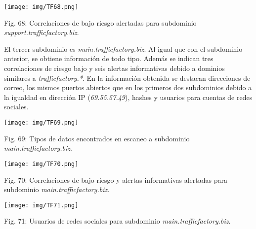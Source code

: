 \documentclass[12pt,oneside,a4paper]{book}
\begin{document}
\vspace{2em}

\begin{center}
	\texttt{[image: img/TF68.png]}
    
\vspace{0.1em}
    
    Fig. 68: Correlaciones de bajo riesgo alertadas para subdominio \textit{support.trafficfactory.biz}.
\end{center}

\vspace{2em}

\hspace{20pt}
El tercer subdominio es \textit{main.trafficfactory.biz}. Al igual que con el subdominio anterior, se obtiene información de todo tipo. Además se indican tres correlaciones de riesgo bajo y seis alertas informativas debido a dominios similares a \textit{trafficfactory.*}. En la información obtenida se destacan direcciones de correo, los mismos puertos abiertos que en los primeros dos subdominios debido a la igualdad en dirección IP (\textit{69.55.57.49}), hashes y usuarios para cuentas de redes sociales.

\vspace{2em}

\begin{center}
	\texttt{[image: img/TF69.png]}
    
\vspace{0.1em}
    
    Fig. 69: Tipos de datos encontrados en escaneo a subdominio \textit{main.trafficfactory.biz}.
\end{center}

\vspace{2em}

\begin{center}
	\texttt{[image: img/TF70.png]}
    
\vspace{0.1em}
    
    Fig. 70: Correlaciones de  bajo riesgo y alertas informativas alertadas para subdominio \textit{main.trafficfactory.biz}.
\end{center}

\newpage

\begin{center}
	\texttt{[image: img/TF71.png]}
    
\vspace{0.1em}
    
    Fig. 71: Usuarios de redes sociales para subdominio \textit{main.trafficfactory.biz}.
\end{center}
\end{document}
